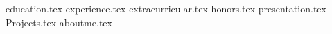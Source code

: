 \documentclass[11pt, a4paper]{awesome-cv}
\newcommand*{\sectiondir}{resume/}
\begin{document}
\makecvheader

{education.tex}
{experience.tex}
{extracurricular.tex}
{honors.tex}
{presentation.tex}
{Projects.tex}
{aboutme.tex}
\end{document}
